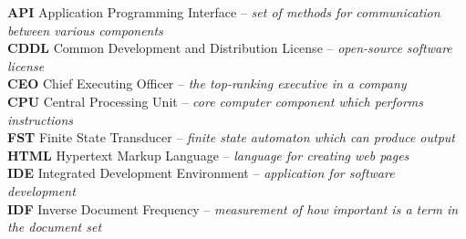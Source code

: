 \documentclass[12pt,a4paper]{report}
\begin{document}



\tableofcontents












\listoffigures



\textbf{API} Application Programming Interface – \textit{set of methods for communication between various components}
\\

\textbf{CDDL} Common Development and Distribution License – \textit{open-source software license}
\\

\textbf{CEO} Chief Executing Officer – \textit{the top-ranking executive in a company}
\\

\textbf{CPU} Central Processing Unit – \textit{core computer component which performs instructions}
\\

\textbf{FST} Finite State Transducer – \textit{finite state automaton which can produce output}
\\

\textbf{HTML} Hypertext Markup Language – \textit{language for creating web pages}
\\

\textbf{IDE} Integrated Development Environment – \textit{application for software development}
\\

\textbf{IDF} Inverse Document Frequency – \textit{measurement of how important is a term in the document set}
\\
\end{document}
